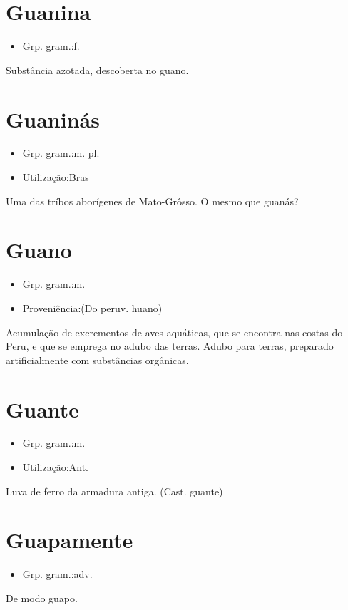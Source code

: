 \section{Guanina}
\begin{itemize}
\item {Grp. gram.:f.}
\end{itemize}
Substância azotada, descoberta no guano.
\section{Guaninás}
\begin{itemize}
\item {Grp. gram.:m. pl.}
\end{itemize}
\begin{itemize}
\item {Utilização:Bras}
\end{itemize}
Uma das tríbos aborígenes de Mato-Grôsso.
O mesmo que \textunderscore guanás\textunderscore ?
\section{Guano}
\begin{itemize}
\item {Grp. gram.:m.}
\end{itemize}
\begin{itemize}
\item {Proveniência:(Do peruv. \textunderscore huano\textunderscore )}
\end{itemize}
Acumulação de excrementos de aves aquáticas, que se encontra nas costas do Peru, e que se emprega no adubo das terras.
Adubo para terras, preparado artificialmente com substâncias orgânicas.
\section{Guante}
\begin{itemize}
\item {Grp. gram.:m.}
\end{itemize}
\begin{itemize}
\item {Utilização:Ant.}
\end{itemize}
Luva de ferro da armadura antiga.
(Cast. \textunderscore guante\textunderscore )
\section{Guapamente}
\begin{itemize}
\item {Grp. gram.:adv.}
\end{itemize}
De modo guapo.
